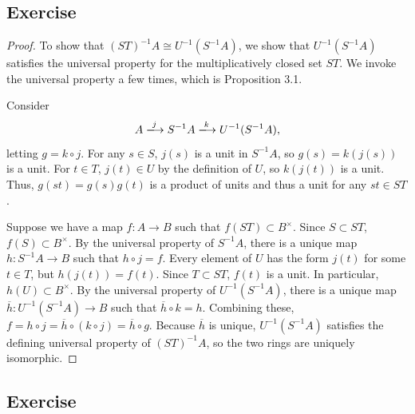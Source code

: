 \subsection{Exercise}\label{3.3}

\begin{proof}
To show that $(ST)^{-1}A \cong U^{-1}(S^{-1}A)$, we show that $U^{-1}(S^{-1}A)$ satisfies the universal property for the multiplicatively closed set $ST$. We invoke the
universal property a few times, which is Proposition 3.1.

Consider
$$A \xlongrightarrow{j} S^{-1}A \xlongrightarrow{k} U^{-1}(S^{-1}A),$$
letting $g = k \circ j$. For any $s \in S$, $j(s)$ is a unit in $S^{-1}A$, so $g(s) = k(j(s))$ is a unit. For $t \in T$,
$j(t) \in U$ by the definition of $U$, so $k(j(t))$ is a unit. Thus, $g(st) = g(s)g(t)$ is a product of units and thus a unit for any $st \in ST$.

Suppose we have a map $f : A \to B$ such that $f(ST) \subset B^{\times}$. Since $S \subset ST$, $f(S) \subset B^{\times}$. By the universal property of $S^{-1}A$,
there is a unique map $h : S^{-1}A \to B$ such that $h \circ j = f$. Every element of $U$ has the form $j(t)$ for some $t \in T$, but $h(j(t)) = f(t)$. Since $T \subset ST$,
$f(t)$ is a unit. In particular, $h(U) \subset B^{\times}$. By the universal property of $U^{-1}(S^{-1}A)$, there is a unique map $\overline{h}:U^{-1}(S^{-1}A) \to B$ such that
$\overline{h} \circ k = h$. Combining these, $f = h \circ j = \overline{h} \circ (k \circ j) = \overline{h} \circ g$. Because $\overline{h}$ is unique, $U^{-1}(S^{-1}A)$ satisfies
the defining universal property of $(ST)^{-1}A$, so the two rings are uniquely isomorphic.
\end{proof}

\subsection{Exercise}\label{3.4}

